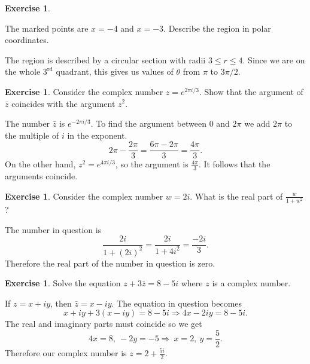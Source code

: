 \documentclass[12pt]{article}
\theoremstyle{plain}
\theoremstyle{definition}
\newtheorem{Ej}[Th]{Exercise}         %
\theoremstyle{remark}
\newcommand{\te}{\theta}                %
\renewcommand{\leq}{\leqslant}      %
\renewcommand{\:}{\colon}           %
\renewcommand{\.}{\Cdot}                %
\newcommand{\To}{\Rightarrow}
\begin{document}
\begin{Ej}
\begin{figure}[h]
\begin{center}
\end{center}
  \end{figure}
  The marked points are $x=-4$ and $x=-3$. Describe the region in polar coordinates.
\end{Ej}

\begin{ptcb}
  The region is described by a circular section with radii $3\leq r\leq 4$. Since we are on the whole $3^{\text{rd}}$ quadrant, this gives us values of $\te$ from $\pi$ to $3\pi/2$.
\end{ptcb}

\begin{Ej}
  Consider the complex number $z=e^{2\pi i/3}$. Show that the argument of $\bar{z}$ coincides with the argument $z^2$.
\end{Ej}

\begin{ptcb}
  The number $\bar{z}$ is $e^{-2\pi i/3}$. To find the argument between $0$ and $2\pi$ we add $2\pi$ to the multiple of $i$ in the exponent. 
  $$2\pi-\frac{2\pi}{3}=\frac{6\pi-2\pi}{3}=\frac{4\pi}{3}.$$
  On the other hand, $z^2=e^{4\pi i/3}$, so the argument is $\frac{4\pi}{3}$. It follows that the arguments coincide.
\end{ptcb}

\begin{Ej}
  Consider the complex number $w=2i$. What is the real part of $\frac{w}{1+w^2}$?
\end{Ej}

\begin{ptcb}
  The number in question is 
  $$\frac{2i}{1+(2i)^2}=\frac{2i}{1+4i^2}=\frac{-2i}{3}.$$
  Therefore the real part of the number in question is zero.
\end{ptcb}

\begin{Ej}
 Solve the equation $z+3\bar z=8-5i$ where $z$ is a complex number. 
\end{Ej}

\begin{ptcb}
 If $z=x+iy$, then $\bar z = x-iy$. The equation in question becomes 
 $$x+iy+3(x-iy)=8-5i\To 4x-2iy=8-5i.$$
 The real and imaginary parts must coincide so we get 
 $$4x=8,\ -2y=-5\To\ x=2,\ y=\frac{5}{2}.$$
 Therefore our complex number is $z=2+\frac{5i}{2}$.
\end{ptcb}


\end{document}
